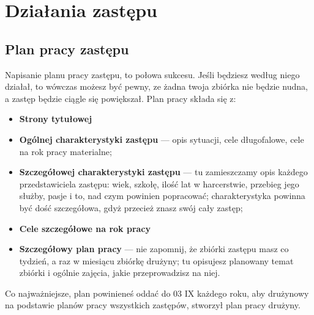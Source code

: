 \chapter{Działania zastępu}

\section{Plan pracy zastępu}

Napisanie planu pracy zastępu, to połowa sukcesu. Jeśli będziesz według niego działał, to wówczas możesz być pewny, ze żadna twoja zbiórka nie będzie nudna, a zastęp będzie ciągle się powiększał. Plan pracy składa się z:
\begin{itemize}[noitemsep] 
\item \textbf{Strony tytułowej}
\item \textbf{Ogólnej charakterystyki zastępu} --- opis sytuacji, cele długofalowe, cele na rok pracy materialne;
\item \textbf{Szczegółowej charakterystyki zastępu} --- tu zamieszczamy opis każdego przedstawiciela zastępu: wiek, szkołę, ilość lat w harcerstwie, przebieg jego służby, pasje i to, nad czym powinien popracować; charakterystyka powinna być dość szczegółowa, gdyż przecież znasz swój cały zastęp;
\item \textbf{Cele szczegółowe na rok pracy}
\item \textbf{Szczegółowy plan pracy} --- nie zapomnij, że zbiórki zastępu masz co tydzień, a raz w miesiącu zbiórkę drużyny; tu opisujesz planowany temat zbiórki i ogólnie zajęcia, jakie przeprowadzisz na niej.
\end{itemize}

\noindent
Co najważniejsze, plan powinieneś oddać do 03 IX każdego roku, aby drużynowy na podstawie planów pracy wszystkich zastępów, stworzył plan pracy drużyny. 

